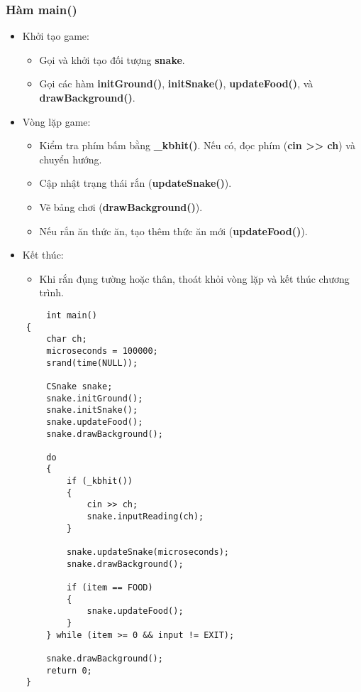 \documentclass[a4paper, 12pt]{article}
\begin{document}
\subsubsection{Hàm main()}
\begin{center}
    \begin{itemize}
        \item Khởi tạo game:
        \begin{itemize}
            \item Gọi và khởi tạo đối tượng \textbf{snake}.
            \item Gọi các hàm \textbf{initGround()}, \textbf{initSnake()}, \textbf{updateFood()}, và \textbf{drawBackground()}.
        \end{itemize}
        
        \item Vòng lặp game:
        \begin{itemize}
            \item Kiểm tra phím bấm bằng \textbf{\_kbhit()}. Nếu có, đọc phím (\textbf{cin >> ch}) và chuyển hướng.
            \item Cập nhật trạng thái rắn (\textbf{updateSnake()}).
            \item Vẽ bảng chơi (\textbf{drawBackground()}).
            \item Nếu rắn ăn thức ăn, tạo thêm thức ăn mới (\textbf{updateFood()}).
        \end{itemize}
        
        \item Kết thúc:
        \begin{itemize}
            \item Khi rắn đụng tường hoặc thân, thoát khỏi vòng lặp và kết thúc chương trình.
        \end{itemize}
    \end{itemize}

    \begin{lstlisting}
        int main()
    {
        char ch;
        microseconds = 100000;
        srand(time(NULL));
    
        CSnake snake;
        snake.initGround();
        snake.initSnake();
        snake.updateFood();
        snake.drawBackground();
    
        do
        {
            if (_kbhit())
            {
                cin >> ch;
                snake.inputReading(ch);
            }
    
            snake.updateSnake(microseconds);
            snake.drawBackground();
    
            if (item == FOOD)
            {
                snake.updateFood();
            }
        } while (item >= 0 && input != EXIT);
    
        snake.drawBackground();
        return 0;
    }
    \end{lstlisting}
\end{center}
\end{document}
